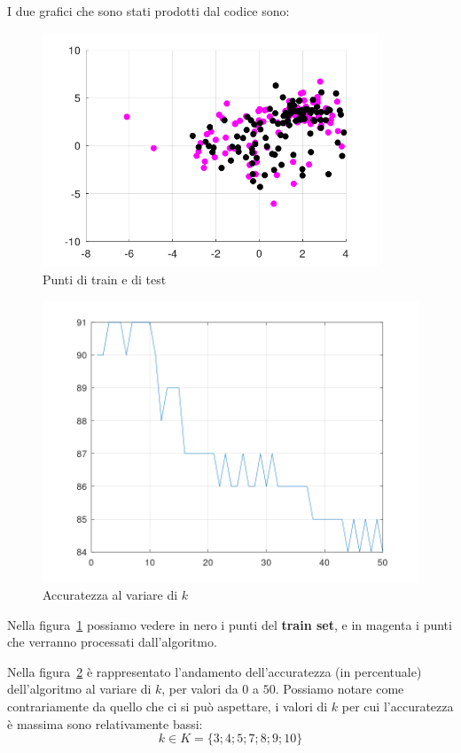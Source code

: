 \documentclass[a4paper]{article}
\begin{document}
I due grafici che sono stati prodotti dal codice sono:
\begin{figure}
\centering
\includegraphics[width=10cm]{punti}
\caption{Punti di train e di test}
\label{fig:punti}
\end{figure}
\begin{figure}
\centering
\includegraphics[width=12cm]{accuratezza}
\caption{Accuratezza al variare di $k$}
\label{fig:acc}
\end{figure}

Nella figura~\ref{fig:punti} possiamo vedere in nero i punti del \textbf{train set}, e in magenta i punti che verranno processati dall'algoritmo.

Nella figura~\ref{fig:acc} è rappresentato l'andamento dell'accuratezza (in percentuale) dell'algoritmo al variare di $k$, per valori da $0$ a $50$. Possiamo notare come contrariamente da quello che ci si può aspettare, i valori di $k$ per cui l'accuratezza è massima sono relativamente bassi:
\[
k \in K = \{3; 4; 5; 7; 8; 9; 10\}
\]
\end{document}
